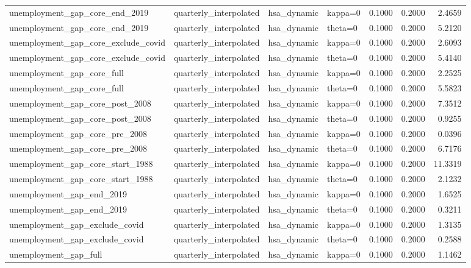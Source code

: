 \begin{tabular}{llllrrr}
unemployment\_gap\_core\_end\_2019 & quarterly\_interpolated & hsa\_dynamic & kappa=0 & 0.1000 & 0.2000 & 2.4659 \\
unemployment\_gap\_core\_end\_2019 & quarterly\_interpolated & hsa\_dynamic & theta=0 & 0.1000 & 0.2000 & 5.2120 \\
unemployment\_gap\_core\_exclude\_covid & quarterly\_interpolated & hsa\_dynamic & kappa=0 & 0.1000 & 0.2000 & 2.6093 \\
unemployment\_gap\_core\_exclude\_covid & quarterly\_interpolated & hsa\_dynamic & theta=0 & 0.1000 & 0.2000 & 5.4140 \\
unemployment\_gap\_core\_full & quarterly\_interpolated & hsa\_dynamic & kappa=0 & 0.1000 & 0.2000 & 2.2525 \\
unemployment\_gap\_core\_full & quarterly\_interpolated & hsa\_dynamic & theta=0 & 0.1000 & 0.2000 & 5.5823 \\
unemployment\_gap\_core\_post\_2008 & quarterly\_interpolated & hsa\_dynamic & kappa=0 & 0.1000 & 0.2000 & 7.3512 \\
unemployment\_gap\_core\_post\_2008 & quarterly\_interpolated & hsa\_dynamic & theta=0 & 0.1000 & 0.2000 & 0.9255 \\
unemployment\_gap\_core\_pre\_2008 & quarterly\_interpolated & hsa\_dynamic & kappa=0 & 0.1000 & 0.2000 & 0.0396 \\
unemployment\_gap\_core\_pre\_2008 & quarterly\_interpolated & hsa\_dynamic & theta=0 & 0.1000 & 0.2000 & 6.7176 \\
unemployment\_gap\_core\_start\_1988 & quarterly\_interpolated & hsa\_dynamic & kappa=0 & 0.1000 & 0.2000 & 11.3319 \\
unemployment\_gap\_core\_start\_1988 & quarterly\_interpolated & hsa\_dynamic & theta=0 & 0.1000 & 0.2000 & 2.1232 \\
unemployment\_gap\_end\_2019 & quarterly\_interpolated & hsa\_dynamic & kappa=0 & 0.1000 & 0.2000 & 1.6525 \\
unemployment\_gap\_end\_2019 & quarterly\_interpolated & hsa\_dynamic & theta=0 & 0.1000 & 0.2000 & 0.3211 \\
unemployment\_gap\_exclude\_covid & quarterly\_interpolated & hsa\_dynamic & kappa=0 & 0.1000 & 0.2000 & 1.3135 \\
unemployment\_gap\_exclude\_covid & quarterly\_interpolated & hsa\_dynamic & theta=0 & 0.1000 & 0.2000 & 0.2588 \\
unemployment\_gap\_full & quarterly\_interpolated & hsa\_dynamic & kappa=0 & 0.1000 & 0.2000 & 1.1462 \\

\end{tabular}
